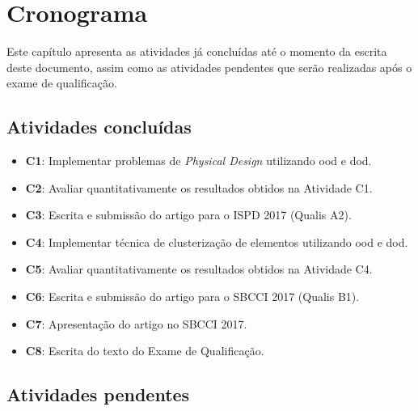 \chapter{Cronograma}
\label{cap:cronograma}

Este capítulo apresenta as atividades já concluídas até o momento da escrita deste documento, assim como as atividades pendentes que serão realizadas após o exame de qualificação.

\section{Atividades concluídas}

\begin{itemize}
    \item \textbf{C1}: Implementar problemas de \textit{Physical Design} utilizando \ac{ood} e \ac{dod}.
    \item \textbf{C2}: Avaliar quantitativamente os resultados obtidos na Atividade C1.
    \item \textbf{C3}: Escrita e submissão do artigo para o ISPD 2017 (Qualis A2).
    \item \textbf{C4}: Implementar técnica de clusterização de elementos utilizando \ac{ood} e \ac{dod}.
    \item \textbf{C5}: Avaliar quantitativamente os resultados obtidos na Atividade C4.
    \item \textbf{C6}: Escrita e submissão do artigo para o SBCCI 2017 (Qualis B1).
    \item \textbf{C7}: Apresentação do artigo no SBCCI 2017.
    \item \textbf{C8}: Escrita do texto do Exame de Qualificação.
\end{itemize}

\section{Atividades pendentes}

